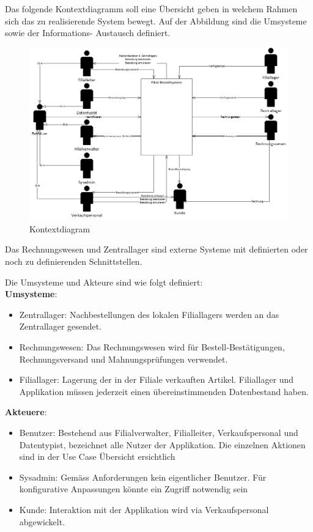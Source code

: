 Das folgende Kontextdiagramm soll eine Übersicht geben in welchem Rahmen sich das zu
realisierende System bewegt. Auf der Abbildung sind die Umsysteme sowie der Informations-
Austausch definiert.

\begin{figure}[H]
	\includegraphics[width=1.0\linewidth]{Images/kontextdiagram}
	\caption{Kontextdiagram}
	\label{fig:kontextdiagram}
\end{figure}

Das Rechnungswesen und Zentrallager sind externe Systeme mit definierten oder noch zu definierenden Schnittstellen.

Die Umsysteme und Akteure sind wie folgt definiert:\\
\textbf{Umsysteme}:
\begin{itemize}
\item Zentrallager: Nachbestellungen des lokalen Filiallagers werden an das Zentrallager gesendet.
\item Rechnungswesen: Das Rechnungswesen wird für Bestell-Bestätigungen, Rechnungsversand und Mahnungsprüfungen verwendet.
\item Filiallager: Lagerung der in der Filiale verkauften Artikel. Filiallager und Applikation müssen jederzeit einen übereinstimmenden Datenbestand haben.
\end{itemize}

\textbf{Akteuere}:
\begin{itemize}
\item Benutzer: Bestehend aus Filialverwalter, Filialleiter, Verkaufspersonal und Datentypist, bezeichnet alle Nutzer der Applikation. Die einzelnen Aktionen sind in der Use Case Übersicht ersichtlich
\item Sysadmin: Gemäss Anforderungen kein eigentlicher Benutzer. Für konfigurative Anpassungen könnte ein Zugriff notwendig sein
\item Kunde: Interaktion mit der Applikation wird via Verkaufspersonal abgewickelt.
\end{itemize}